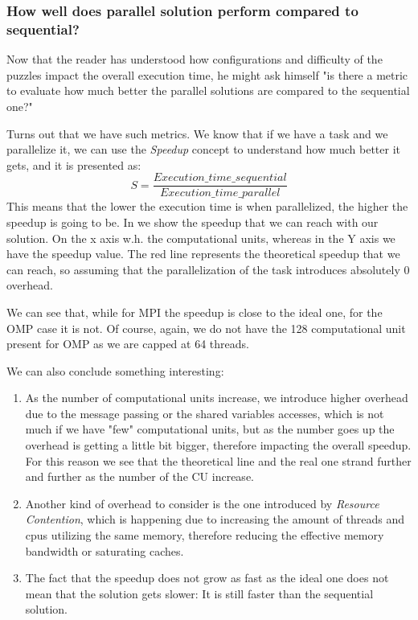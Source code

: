 \subsubsection{How well does parallel solution perform compared to sequential?}
\label{subsubsec:speedup_efficiency}

Now that the reader has understood how configurations and difficulty of the puzzles impact the overall execution time, he might ask himself "is there a metric to evaluate how much better the parallel solutions are compared to the sequential one?"

Turns out that we have such metrics. We know that if we have a task and we parallelize it, we can use the \textit{Speedup} concept to understand how much better it gets, and it is presented as:
\[
S = \frac{Execution\_time\_sequential}{Execution\_time\_parallel}
\]
This means that the lower the execution time is when parallelized, the higher the speedup is going to be. In  we show the speedup that we can reach with our solution. On the x axis w.h. the computational units, whereas in the Y axis we have the speedup value. The red line represents the theoretical speedup that we can reach, so assuming that the parallelization of the task introduces absolutely 0 overhead.


We can see that, while for MPI the speedup is close to the ideal one, for the OMP case it is not. Of course, again, we do not have the 128 computational unit present for OMP as we are capped at 64 threads.

We can also conclude something interesting:
\begin{enumerate}
    \item As the number of computational units increase, we introduce higher overhead due to the message passing or the shared variables accesses, which is not much if we have "few" computational units, but as the number goes up the overhead is getting a little bit bigger, therefore impacting the overall speedup. For this reason we see that the theoretical line and the real one strand further and further as the number of the CU increase.
    \item Another kind of overhead to consider is the one introduced by \textit{Resource Contention}, which is happening due to increasing the amount of threads and cpus utilizing the same memory, therefore reducing the effective memory bandwidth or saturating caches.
    \item The fact that the speedup does not grow as fast as the ideal one does not mean that the solution gets slower: It is still faster than the sequential solution.
\end{enumerate}



